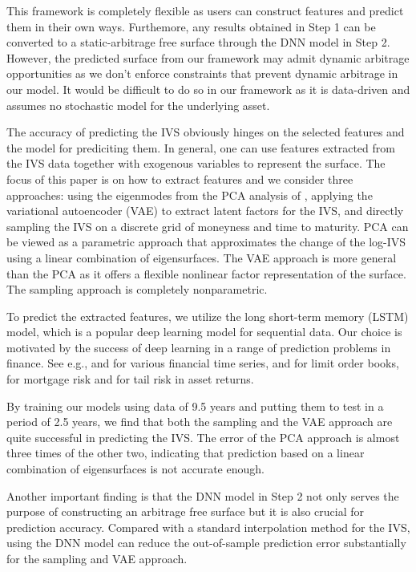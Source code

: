 \documentclass[11pt,a4paper]{article}
\theoremstyle{remark}
\begin{document}
This framework is completely flexible as users can construct features and predict them in their own ways. Furthemore, any results obtained in Step 1 can be converted to a static-arbitrage free surface through the DNN model in Step 2. However, the predicted surface from our framework may admit dynamic arbitrage opportunities as we don't enforce constraints that prevent dynamic arbitrage in our model. It would be difficult to do so in our framework as it is data-driven and assumes no stochastic model for the underlying asset.

The accuracy of predicting the IVS obviously hinges on the selected features and the model for prediciting them. In general, one can use features extracted from the IVS data together with exogenous variables to represent the surface. The focus of this paper is on how to extract features and we consider three approaches: using the eigenmodes from the PCA analysis of \cite{cont2002dynamics}, applying the variational autoencoder (VAE) to extract latent factors for the IVS, and directly sampling the IVS on a discrete grid of moneyness and time to maturity. PCA can be viewed as a parametric approach that approximates the change of the log-IVS using a linear combination of eigensurfaces.
The VAE approach is more general than the PCA as it offers a flexible nonlinear factor representation of the surface. The sampling approach is completely nonparametric. 

To predict the extracted features, we utilize the long short-term memory (LSTM) model, which is a popular deep learning model for sequential data. Our choice is motivated by the success of deep learning in a range of prediction problems in finance. See e.g., \cite{borovykh2017conditional} and \cite{sezer2020financial} for various financial time series, \cite{sirignano2019deep} and \cite{sirignano2019universal} for limit order books, \cite{sirignano2018deep} for mortgage risk and \cite{yan2018} for tail risk in asset returns. 

By training our models using data of 9.5 years and putting them to test in a period of 2.5 years, we find that both the sampling and the VAE approach are quite successful in predicting the IVS. The error of the PCA approach is almost three times of the other two, indicating that prediction based on a linear combination of eigensurfaces is not accurate enough.

Another important finding is that the DNN model in Step 2 not only serves the purpose of constructing an arbitrage free surface but it is also crucial for prediction accuracy. Compared with a standard interpolation method for the IVS, using the DNN model can reduce the out-of-sample prediction error substantially for the sampling and VAE approach. 
\end{document}
